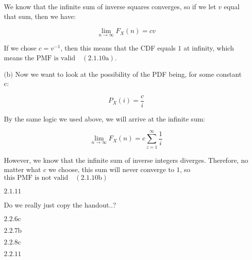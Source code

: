 \documentclass{article}
\newcommand{\problem}[2]{$\boxed{\text{#1.#2}}$}
\newcommand{\subproblem}[3]{$\boxed{\text{(#3)}}$}
\newcommand{\subsolution}[4]{\boxed{#4\quad(\text{#1.#2#3})}}
\begin{document}
We know that the infinite sum of inverse squares converges, so if we
let $v$ equal that sum, then we have:

\[
\lim\limits_{n\rightarrow\infty}F_X(n)=cv
\]

If we chose $c=v^{-1}$, then this means that the CDF equals $1$ at
infinity, which means
$\subsolution{2.1}{10}{a}{\text{the PMF is valid}}$.

%
\subproblem{2.1}{10}{b} Now we want to look at the possibility of the
PDF being, for some constant c:

\[
P_X(i)=\frac{c}{i}
\]

By the same logic we used above, we will arrive at the infinite sum:

\[
\lim\limits_{n\rightarrow\infty}F_X(n)=c\sum\limits_{z=1}^\infty \frac{1}{i}
\]

However, we know that the infinite sum of inverse integers
diverges. Therefore, no matter what $c$ we choose, this sum will never
converge to $1$, so $\subsolution{2.1}{10}{b}{\text{this PMF is not valid}}$

%
\problem{2.1}{11}

Do we really just copy the handout..?

%
\problem{2.2}{6c}



%
\problem{2.2}{7b}

%
\problem{2.2}{8c}

%
\problem{2.2}{11}
\end{document}
